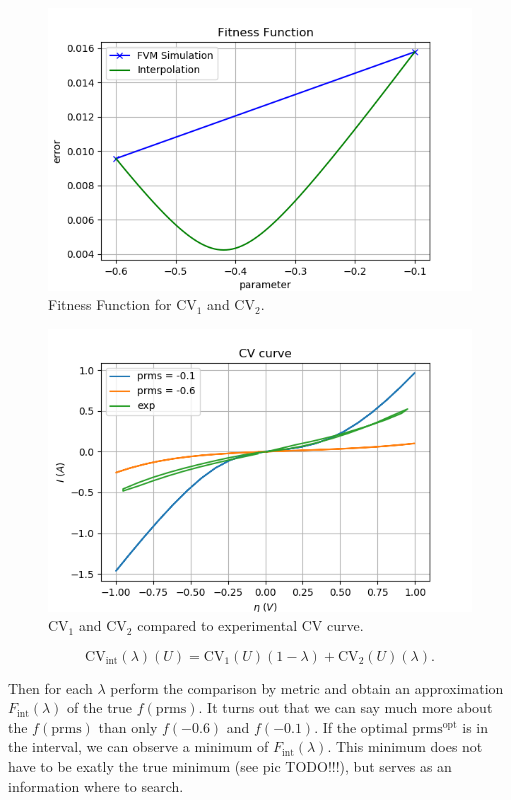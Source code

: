 \documentclass{article}
\numberwithin{equation}{section}
\def\prms{\text{prms}}
\def\CVone{\text{CV}_1}
\def\CVtwo{\text{CV}_2}
\def\CVint{\text{CV}_\text{int}}
\def\fint{F_\text{int}}
\begin{document}
\begin{figure}
	\centering
  	\includegraphics[scale=0.5]{./Images/FF_two.png}
	\caption{Fitness Function for $\CVone$ and $\CVtwo$.}
	\label{fig:FF_two}
\end{figure}
\begin{figure}
	\centering
  	\includegraphics[scale=0.5]{./Images/CV_two.png}
	\caption{$\CVone$ and $\CVtwo$ compared to experimental CV curve.}
	\label{fig:CV_two}
\end{figure}

$$\CVint (\lambda)(U) = \CVone(U) (1 - \lambda) + \CVtwo(U) (\lambda).$$

Then for each $\lambda$ perform the comparison by metric and obtain an approximation $\fint(\lambda)$ of the true $f(\prms)$.
It turns out that we can say much more about the $f(\prms)$ than only $f(-0.6)$ and $f(-0.1)$. If the optimal $\prms^{\text{opt}}$ is in the interval, we can observe a minimum of $\fint(\lambda)$. This minimum does not have to be exatly the true minimum (see pic TODO!!!), but serves as an information where to search.
\end{document}
